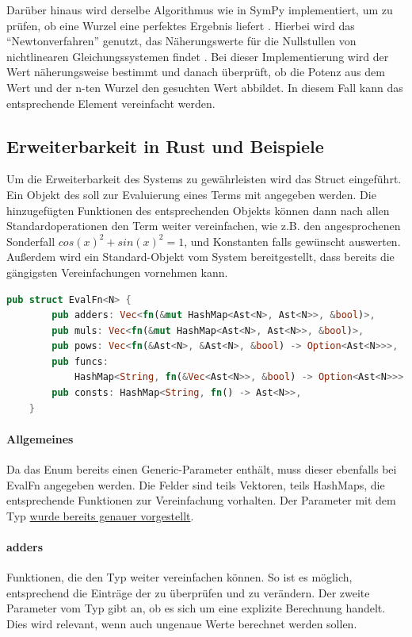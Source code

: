 \documentclass[11pt,a4paper, ngerman]{article}
\begin{document}
Darüber hinaus wird derselbe Algorithmus wie in SymPy implementiert, um zu prüfen, ob eine Wurzel eine perfektes Ergebnis liefert \cite{SymPyNewton}. Hierbei wird das ``Newtonverfahren'' genutzt, das Näherungswerte für die Nullstullen von nichtlinearen Gleichungssystemen findet \cite[S. 28 ff.]{NewtonDetail}. Bei dieser Implementierung wird der Wert näherungsweise bestimmt und danach überprüft, ob die Potenz aus dem Wert und der n-ten Wurzel den gesuchten Wert abbildet. In diesem Fall kann das entsprechende Element vereinfacht werden.

\label{sec:kapErRustUndBei}
\subsection{Erweiterbarkeit in Rust und Beispiele}
Um die Erweiterbarkeit des Systems zu gewährleisten wird das Struct  eingeführt. Ein Objekt des  soll zur Evaluierung eines Terms mit angegeben werden. Die hinzugefügten Funktionen des entsprechenden Objekts können dann nach allen Standardoperationen den Term weiter vereinfachen, wie z.B. den angesprochenen Sonderfall $cos(x)^2+sin(x)^2 = 1$, und Konstanten falls gewünscht auswerten. Außerdem wird ein Standard-Objekt vom System bereitgestellt, dass bereits die gängigsten Vereinfachungen vornehmen kann.

\begin{lstlisting}[language=rust, caption={Defintion EvalFn}]
    pub struct EvalFn<N> {
        pub adders: Vec<fn(&mut HashMap<Ast<N>, Ast<N>>, &bool)>,
        pub muls: Vec<fn(&mut HashMap<Ast<N>, Ast<N>>, &bool)>,
        pub pows: Vec<fn(&Ast<N>, &Ast<N>, &bool) -> Option<Ast<N>>>,
        pub funcs: 
            HashMap<String, fn(&Vec<Ast<N>>, &bool) -> Option<Ast<N>>>,
        pub consts: HashMap<String, fn() -> Ast<N>>,
    }
\end{lstlisting}

\paragraph{Allgemeines} Da das Enum  bereits einen Generic-Parameter enthält, muss dieser ebenfalls bei EvalFn angegeben werden. Die Felder sind teils Vektoren, teils HashMaps, die entsprechende Funktionen zur Vereinfachung vorhalten. Der Parameter mit dem Typ  \hyperref[sec:kapAddnundMult]{wurde bereits genauer vorgestellt}.

\paragraph{adders} Funktionen, die den Typ  weiter vereinfachen können. So ist es möglich, entsprechend die Einträge der  zu überprüfen und zu verändern. Der zweite Parameter vom Typ  gibt an, ob es sich um eine explizite Berechnung handelt. Dies wird relevant, wenn auch ungenaue Werte berechnet werden sollen.
\end{document}
